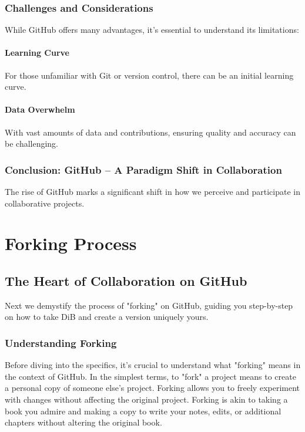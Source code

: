 \documentclass{book}
\begin{document}
\subsection*{Challenges and Considerations}
While GitHub offers many advantages, it's essential to understand its limitations:

\subsubsection*{Learning Curve}
For those unfamiliar with Git or version control, there can be an initial learning curve.

\subsubsection*{Data Overwhelm}
With vast amounts of data and contributions, ensuring quality and accuracy can be challenging.

\subsection*{Conclusion: GitHub – A Paradigm Shift in Collaboration}
The rise of GitHub marks a significant shift in how we perceive and participate in collaborative projects. 

\chapter{Forking Process}
\section*{The Heart of Collaboration on GitHub}
Next we demystify the process of "forking" on GitHub, guiding you step-by-step on how to take DiB and create a version uniquely yours.

\subsection*{Understanding Forking}
Before diving into the specifics, it's crucial to understand what "forking" means in the context of GitHub. In the simplest terms, to "fork" a project means to create a personal copy of someone else's project. Forking allows you to freely experiment with changes without affecting the original project. Forking is akin to taking a book you admire and making a copy to write your notes, edits, or additional chapters without altering the original book.
\end{document}
